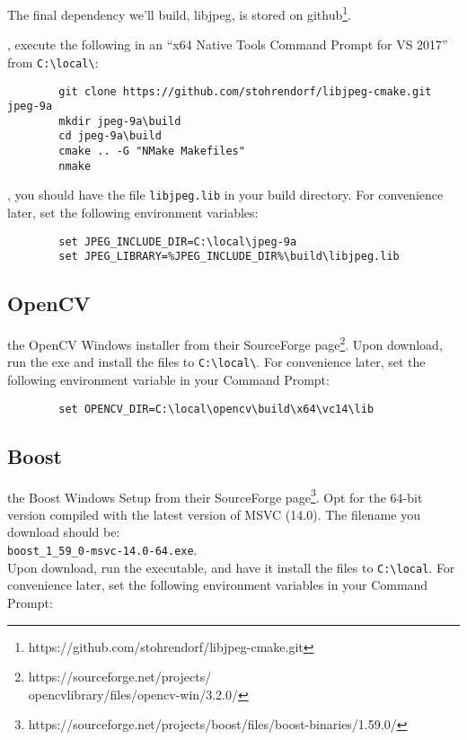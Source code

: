 \documentclass{tufte-handout}
\begin{document}
    The final dependency we'll build, libjpeg,  is stored on 
    github\footnote{https://github.com/stohrendorf/libjpeg-cmake.git}.

    , execute the following in an ``x64 Native Tools Command
    Prompt for VS 2017'' from \Verb|C:\local\|:

    \begin{lstlisting}
        git clone https://github.com/stohrendorf/libjpeg-cmake.git jpeg-9a
        mkdir jpeg-9a\build
        cd jpeg-9a\build
        cmake .. -G "NMake Makefiles"
        nmake
    \end{lstlisting}

    , you should have the file \Verb|libjpeg.lib| in your build
    directory.  For convenience later, set the following environment variables:

    \begin{lstlisting}
        set JPEG_INCLUDE_DIR=C:\local\jpeg-9a
        set JPEG_LIBRARY=%JPEG_INCLUDE_DIR%\build\libjpeg.lib
    \end{lstlisting}

\subsection{OpenCV}

     the OpenCV Windows installer from their SourceForge 
    page\footnote{https://sourceforge.net/projects/\\ opencvlibrary/files/opencv-win/3.2.0/}.  Upon
    download, run the exe and install the files to \Verb|C:\local\|.  For convenience later,
    set the following environment variable in your Command Prompt:

    \begin{lstlisting}
        set OPENCV_DIR=C:\local\opencv\build\x64\vc14\lib
    \end{lstlisting}

\subsection{Boost}

     the Boost Windows Setup from their SourceForge 
    page\footnote{https://sourceforge.net/projects/boost/files/boost-binaries/1.59.0/}.  Opt for
    the 64-bit version compiled with the latest version of MSVC (14.0).  The filename you download
    should be:\\ \Verb|boost_1_59_0-msvc-14.0-64.exe|.\\  Upon download, run the executable, and 
    have it install the files to \Verb|C:\local|.  For convenience later,
    set the following environment variables in your Command Prompt:
\end{document}
